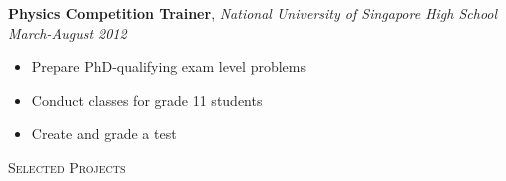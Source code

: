 \documentclass[9pt]{article}
\newenvironment{changemargin}[2]{%
  \begin{list}{}{%
      \setlength{\topsep}{0pt}%
      \setlength{\leftmargin}{#1}%
      \setlength{\rightmargin}{#2}%
      \setlength{\listparindent}{\parindent}%
      \setlength{\itemindent}{\parindent}%
      \setlength{\parsep}{\parskip}%
    }%
  \item[]}{\end{list}
}
\newcommand{\lineover}{
  \begin{changemargin}{-0.05in}{-0.05in}
    \vspace*{-8pt}
    \hrulefill \\
    \vspace*{-2pt}
  \end{changemargin}
}
\newcommand{\header}[1]{
  \begin{changemargin}{-0.5in}{-0.5in}
    \scshape{#1}\\
    \lineover
  \end{changemargin}
}
\newenvironment{body} {
  \vspace*{-16pt}
  \begin{changemargin}{-0.25in}{-0.5in}
  }
  {\end{changemargin}
}
\begin{document}
\begin{body}
  \textbf{Physics Competition Trainer}, \emph{National University of Singapore High School} \hfill \emph{March-August 2012}\\
  \vspace*{-4pt}
  \begin{itemize} \itemsep -0pt  %
  \item Prepare PhD-qualifying exam level problems
  \item Conduct classes for grade 11 students
  \item Create and grade a test
  \end{itemize}
\end{body}

\smallskip

\header{Selected Projects}
\end{document}
